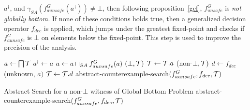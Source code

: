 $a^\dagger$, and $\gamma_{SA}(f_{aunsafe}^G(a^\dagger)) \neq \bot$, then following proposition~\ref{gcf}, 
$f_{unsafe}^G$ is \emph{not globally bottom.}  If none of these conditions holds true, then a 
generalized decision operator $f_{dec}$ is applied, which jumps under the greatest fixed-point and 
checks if $f_{aunsafe}^G$ is $\bot$ on elements below the fixed-point.  This step is used to 
improve the precision of the analysis.
%
\begin{algorithm2e}[t]
\DontPrintSemicolon
{}
\begin{small}
        $a \leftarrow \bigsqcap \mathcal{T}$ \;   
	 {
           $a^\dagger \leftarrow a$ \;
	   $a \leftarrow a \sqcap_{SA} f_{aunsafe}^G(a) $ \;
	}
         {\return $(\bot,\mathcal{T})$} 
        $\mathcal{T} \leftarrow \mathcal{T}.a$ \;
	{\return (non-$\bot, \mathcal{T})$}
	$d \leftarrow f_{dec}$\;
	 {\return (unknown, $a)$}
	$\mathcal{T} \leftarrow \mathcal{T}.d$ \;
	\return abstract-counterexample-search$(f_{aunsafe}^G,f_{dec},\mathcal{T})$\;

\end{small}
\caption{Abstract Search for a non-$\bot$ witness of Global Bottom Problem 
	abstract-counterexample-search$(f_{aunsafe}^G,f_{dec},\mathcal{T})$ \label{gbp}}
\end{algorithm2e}
%


